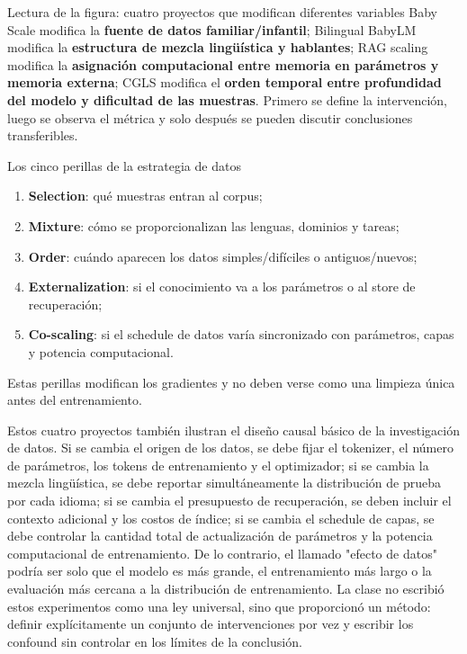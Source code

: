 \begin{knowledgebox}{Lectura de la figura: cuatro proyectos que modifican diferentes variables}
Baby Scale modifica la \textbf{fuente de datos familiar/infantil}; Bilingual BabyLM modifica la \textbf{estructura de mezcla lingüística y hablantes}; RAG scaling modifica la \textbf{asignación computacional entre memoria en parámetros y memoria externa}; CGLS modifica el \textbf{orden temporal entre profundidad del modelo y dificultad de las muestras}. Primero se define la intervención, luego se observa el métrica y solo después se pueden discutir conclusiones transferibles.
\end{knowledgebox}

\begin{importantbox}{Los cinco perillas de la estrategia de datos}
\begin{enumerate}
  \item \textbf{Selection}: qué muestras entran al corpus;
  \item \textbf{Mixture}: cómo se proporcionalizan las lenguas, dominios y tareas;
  \item \textbf{Order}: cuándo aparecen los datos simples/difíciles o antiguos/nuevos;
  \item \textbf{Externalization}: si el conocimiento va a los parámetros o al store de recuperación;
  \item \textbf{Co-scaling}: si el schedule de datos varía sincronizado con parámetros, capas y potencia computacional.
\end{enumerate}
Estas perillas modifican los gradientes y no deben verse como una limpieza única antes del entrenamiento.
\end{importantbox}

Estos cuatro proyectos también ilustran el diseño causal básico de la investigación de datos. Si se cambia el origen de los datos, se debe fijar el tokenizer, el número de parámetros, los tokens de entrenamiento y el optimizador; si se cambia la mezcla lingüística, se debe reportar simultáneamente la distribución de prueba por cada idioma; si se cambia el presupuesto de recuperación, se deben incluir el contexto adicional y los costos de índice; si se cambia el schedule de capas, se debe controlar la cantidad total de actualización de parámetros y la potencia computacional de entrenamiento. De lo contrario, el llamado "efecto de datos" podría ser solo que el modelo es más grande, el entrenamiento más largo o la evaluación más cercana a la distribución de entrenamiento. La clase no escribió estos experimentos como una ley universal, sino que proporcionó un método: definir explícitamente un conjunto de intervenciones por vez y escribir los confound sin controlar en los límites de la conclusión.


